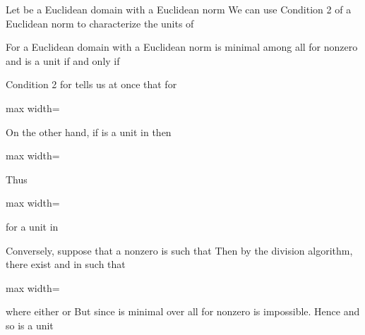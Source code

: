 \documentclass[11pt,oneside]{article}
\begin{document}
\begin{BookBody}
Let  be a Euclidean domain with a Euclidean norm  We can use Condition 2 of a Euclidean norm to characterize the units of 

 For a Euclidean domain with a Euclidean norm  is minimal among all  for nonzero  and  is a unit if and only if 

 Condition 2 for \BookInline{\nu } tells us at once that for 

\begin{center}\begin{adjustbox}{max width=\linewidth}\end{adjustbox}\end{center}

\noindent On the other hand, if  is a unit in  then

\begin{center}\begin{adjustbox}{max width=\linewidth}\end{adjustbox}\end{center}

\noindent Thus

\begin{center}\begin{adjustbox}{max width=\linewidth}\end{adjustbox}\end{center}

\noindent for a unit  in 

Conversely, suppose that a nonzero  is such that  Then by the division algorithm, there exist  and  in  such that

\begin{center}\begin{adjustbox}{max width=\linewidth}\end{adjustbox}\end{center}

\noindent where either  or  But since  is minimal over all  for nonzero  is impossible. Hence  and  so  is a unit\BookEnd{\blacklozenge}

\end{BookBody}
\end{document}
